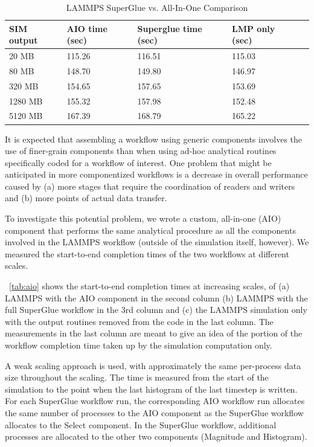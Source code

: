 \begin{table}[tbp]
  \centering
  \caption{LAMMPS SuperGlue vs. All-In-One Comparison}
  \label{tab:aio}
  \vspace{-0.07in}
  \begin{tabular}{|l|l|l|l|l|}
    \hline
    SIM output & AIO time (sec) & Superglue time (sec) & LMP only (sec) \\
    \hline
    20 MB & 115.26 & 116.51 & 115.03\\
    \hline
    80 MB & 148.70 & 149.80 & 146.97\\
    \hline
    320 MB & 154.65 & 157.65 & 153.69\\
    \hline
    1280 MB & 155.32 & 157.98 & 152.48\\
    \hline
    5120 MB & 167.39 & 168.79 & 165.22\\
    \hline
  \end{tabular}
  \vspace{-0.15in}
\end{table}

It is expected that assembling a workflow
using generic components involves the use
of finer-grain components
than when using ad-hoc analytical routines
specifically coded
for a workflow of interest.
One problem that might be anticipated
in more componentized workflows
is a decrease in overall performance caused by
(a) more stages that require the coordination
of readers and writers
and (b) more points of actual data transfer.

To investigate this potential problem,
we wrote a custom, all-in-one (AIO) component
that performs the same analytical procedure
as all the components involved in the LAMMPS workflow
(outside of the simulation itself, however).
We measured
the start-to-end completion times of the two workflows 
at different scales.

~\autoref{tab:aio} shows the start-to-end
completion times
at increasing scales, of
(a) LAMMPS with the AIO component
in the second column
(b) LAMMPS with the full SuperGlue workflow in the 3rd column
and (c) the LAMMPS simulation only with the output routines
removed from the code in the last column.
The measurements in the last column
are meant to give an idea of the portion
of the workflow completion time taken up by the simulation
computation only.

A weak scaling approach
is used, with approximately the same
per-process data size throughout the scaling.
The time is measured from the start of the simulation
to the point when the last histogram of
the last timestep is written.
For each SuperGlue workflow run, the corresponding
AIO workflow run allocates the same
number of processes to the AIO component
as the SuperGlue workflow allocates to the Select component.
In the SuperGlue workflow, additional processes
are allocated to the other two components
(Magnitude and Histogram).

